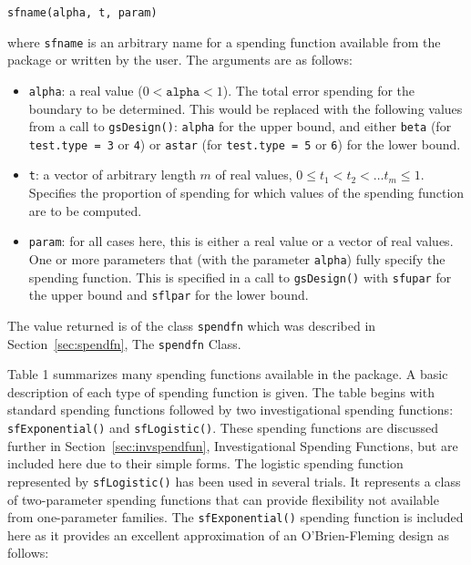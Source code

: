 \bigskip

\texttt{sfname(alpha, t, param)}

\bigskip

where \texttt{sfname} is an arbitrary name for a spending function available
from the package or written by the user. The arguments are as follows:

\begin{itemize}
\item \texttt{alpha}: a real value ($0 < \mathtt{alpha} < 1$).
The total error spending for the boundary to be determined. This would be
replaced with the following values from a call to \texttt{gsDesign()}:
\texttt{alpha} for the upper bound, and either \texttt{beta} (for
\texttt{test.type = 3} or \texttt{4}) or \texttt{astar} (for 
\texttt{test.type = 5} or \texttt{6}) for the lower bound.

\item \texttt{t}: a vector of arbitrary length $m$ of real values, $0 \leq
t_{1} < t_{2} < \ldots t_{m}\leq1$. Specifies the proportion of spending for which
values of the spending function are to be computed.

\item \texttt{param}: for all cases here, this is either a real value or a
vector of real values. One or more parameters that (with the parameter
\texttt{alpha}) fully specify the spending function. This is specified in
a call to \texttt{gsDesign()} with \texttt{sfupar} for the upper bound and
\texttt{sflpar} for the lower bound.
\end{itemize}

The value returned is of the class \texttt{spendfn} which was described in 
Section~\ref{sec:spendfn}, The \texttt{spendfn} Class.

Table 1 summarizes many spending functions available in the package. A basic
description of each type of spending function is given. The table begins with
standard spending functions followed by two investigational spending
functions: \texttt{sfExponential()} and \texttt{sfLogistic()}. These spending
functions are discussed further in Section~\ref{sec:invspendfun}, Investigational Spending Functions, but
are included here due to their simple forms. The logistic spending function
represented by \texttt{sfLogistic()} has been used in several trials. It
represents a class of two-parameter spending functions that can provide
flexibility not available from one-parameter families. The
\texttt{sfExponential()} spending function is included here as it provides an
excellent approximation of an O'Brien-Fleming design as follows:


